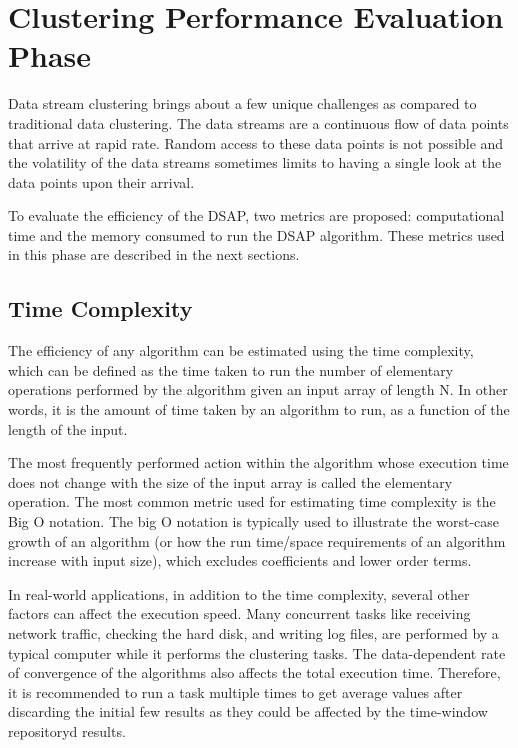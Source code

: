 \section{Clustering Performance Evaluation Phase}

Data stream clustering brings about a few unique challenges as compared to traditional data clustering. The data streams are a continuous flow of data points that arrive at rapid rate. Random access to these data points is not possible and the volatility of the data streams sometimes limits to having a single look at the data points upon their arrival. 


To evaluate the efficiency of the DSAP, two metrics are proposed: computational time and the memory consumed to run the DSAP algorithm. These metrics used in this phase are described in the next sections.

\subsection{Time Complexity}

The efficiency of any algorithm can be estimated using the time complexity, which can be defined as the time taken to run the number of elementary operations performed by the algorithm given an input array of length N. In other words, it is the amount of time taken by an algorithm to run, as a function of the length of the input.  

The most frequently performed action within the algorithm whose execution time does not change with the size of the input array is called the elementary operation. The most common metric used for estimating time complexity is the Big O notation. The big O notation is typically used to illustrate the worst-case growth of an algorithm (or how the run time/space requirements of an algorithm increase with input size), which excludes coefficients and lower order terms.

In real-world applications, in addition to the time complexity, several other factors can affect the execution speed. Many concurrent tasks like receiving network traffic, checking the hard disk, and writing log files, are performed by a typical computer while it performs the clustering tasks. The data-dependent rate of convergence of the algorithms also affects the total execution time. Therefore, it is recommended to run a task multiple times to get average values after discarding the initial few results as they could be affected by the time-window repositoryd results. %


